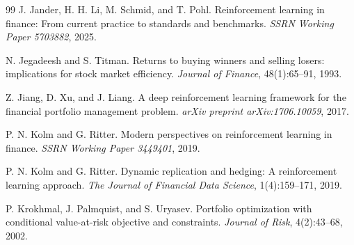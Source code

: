 \documentclass[10pt,twocolumn]{article}
\begin{document}
\begin{thebibliography}{99}
J. Jander, H. H. Li, M. Schmid, and T. Pohl.
\newblock Reinforcement learning in finance: From current practice to standards
  and benchmarks.
\newblock \emph{SSRN Working Paper 5703882}, 2025.


N. Jegadeesh and S. Titman.
\newblock Returns to buying winners and selling losers: implications for stock
  market efficiency.
\newblock \emph{Journal of Finance}, 48(1):65--91, 1993.


Z. Jiang, D. Xu, and J. Liang.
\newblock A deep reinforcement learning framework for the financial portfolio
  management problem.
\newblock \emph{arXiv preprint arXiv:1706.10059}, 2017.


P. N. Kolm and G. Ritter.
\newblock Modern perspectives on reinforcement learning in finance.
\newblock \emph{SSRN Working Paper 3449401}, 2019.

P. N. Kolm and G. Ritter.
\newblock Dynamic replication and hedging: A reinforcement learning approach.
\newblock \emph{The Journal of Financial Data Science}, 1(4):159--171, 2019.


P. Krokhmal, J. Palmquist, and S. Uryasev.
\newblock Portfolio optimization with conditional value-at-risk objective and constraints.
\newblock \emph{Journal of Risk}, 4(2):43--68, 2002.



\end{thebibliography}
\end{document}
